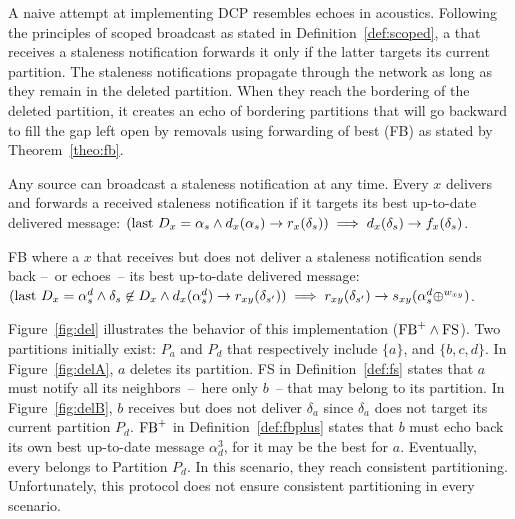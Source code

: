 A naive attempt at implementing DCP resembles echoes in
acoustics. Following the principles of scoped broadcast as stated in
Definition~\ref{def:scoped}, a \process that receives a staleness
notification forwards it only if the latter targets its current
partition. The staleness notifications propagate through the network
as long as they remain in the deleted partition. When they reach the
bordering \processes of the deleted partition, it creates an echo of
bordering partitions that will go backward to fill the gap left open
by removals using forwarding of best (FB) as stated by
Theorem~\ref{theo:fb}.



\begin{definition}
  Any source can broadcast a staleness notification at any
  time. Every \process $x$ delivers and forwards a received staleness
  notification if it targets its best up-to-date delivered message:
  $(\textup{last}~D_x = \alpha_s \wedge d_x(\alpha_s) \rightarrow
  r_x(\delta_s)) \implies d_x(\delta_s) \rightarrow f_x(\delta_s)$.
\end{definition}

\begin{definition} FB where
  a \process $x$ that receives but does not deliver a staleness
  notification sends back --~or echoes~-- its best up-to-date
  delivered message: $(\textup{last}~D_x = \alpha_s^d \wedge \delta_s
  \not\in D_x \wedge d_x(\alpha_s^d)\rightarrow r_{xy}(\delta_{s'}))
  \implies r_{xy}(\delta_{s'}) \rightarrow
  s_{xy}(\alpha_s^d\oplus^{w_{xy}})$.

  
\end{definition}

Figure~\ref{fig:del} illustrates the behavior of this implementation
($\textup{FB}^+ \wedge \textup{FS}$).  Two partitions initially exist:
$P_a$ and $P_d$ that respectively include $\{a\}$, and $\{b, c,
d\}$. In Figure~\ref{fig:delA}, $a$ deletes its partition. FS in
Definition~\ref{def:fs} states that $a$ must notify all its
neighbors~--~here only $b$~-- that may belong to its partition.  In
Figure~\ref{fig:delB}, $b$ receives but does not deliver $\delta_a$
since $\delta_a$ does not target its current partition $P_d$.
$\textup{FB}^+$ in Definition~\ref{def:fbplus} states that $b$ must
echo back its own best up-to-date message $\alpha_d^3$, for it may be
the best for $a$. Eventually, every \process belongs to Partition
$P_d$. In this scenario, they reach consistent
partitioning. Unfortunately, this protocol does not ensure consistent
partitioning in every scenario.

